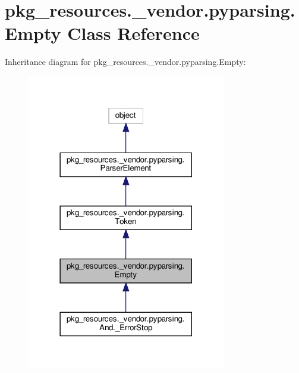 \hypertarget{classpkg__resources_1_1__vendor_1_1pyparsing_1_1Empty}{}\section{pkg\+\_\+resources.\+\_\+vendor.\+pyparsing.\+Empty Class Reference}
\label{classpkg__resources_1_1__vendor_1_1pyparsing_1_1Empty}


Inheritance diagram for pkg\+\_\+resources.\+\_\+vendor.\+pyparsing.\+Empty\+:
\nopagebreak
\begin{figure}[H]
\begin{center}
\leavevmode
\includegraphics[width=246pt]{classpkg__resources_1_1__vendor_1_1pyparsing_1_1Empty__inherit__graph}
\end{center}
\end{figure}


